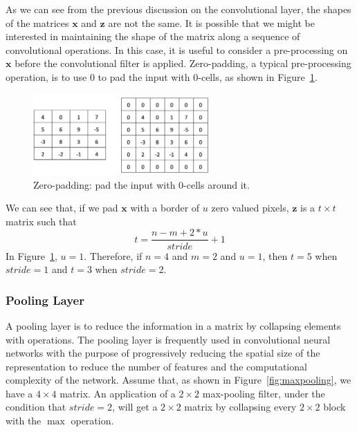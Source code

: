 As we can see from the previous discussion on the convolutional layer, the shapes of the matrices $\textbf{x}$ and $\textbf{z}$ are not the same. It is possible that we might be interested in maintaining the shape of the matrix along a sequence of convolutional operations. In this case, it is useful to consider a pre-processing on $\textbf{x}$ before the convolutional filter is applied. 
%
Zero-padding, a typical pre-processing operation, is to use 0 to pad the input with 0-cells, as shown in Figure~\ref{fig:zeropadding}. 

\begin{figure}
    \centering
    \includegraphics[width=0.6\textwidth]{images/deepLearning/CNN/padding.png}
    \caption{Zero-padding: pad the input with 0-cells around it. }
    \label{fig:zeropadding}
\end{figure}

We can see that,  if we pad $\textbf{x}$ with a border of $u$ zero valued pixels, $\textbf{z}$ is a $t\times t$ matrix such that 
\begin{equation}
    t = \frac{n-m+2*u}{stride}+1
\end{equation}
In Figure~\ref{fig:zeropadding}, $u=1$. Therefore, if $n=4$ and $m=2$ and $u=1$, then $t=5$ when $stride=1$ and $t=3$ when $stride=2$. 

\subsubsection{Pooling Layer}

A pooling layer is to reduce the information in a matrix by collapsing elements with operations. The pooling layer is frequently used in convolutional neural networks with the purpose of progressively reducing the spatial size of the representation to reduce the number of features and the computational complexity of the network. Assume that, as shown in Figure~\ref{fig:maxpooling}, we have a $4\times 4$ matrix. An application of a $2\times 2$ max-pooling filter, under the condition that $stride = 2$, will get a $2\times 2$ matrix by collapsing every $2\times 2$ block with the $\max$ operation. 

